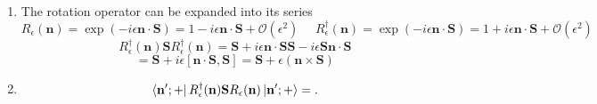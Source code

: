 \begin{sol}
        \begin{enumerate}[label=\textbf{(\alph*)}]
            \item
            The rotation operator can be expanded into its series
            \[
                R_\epsilon(\mathbf{n})=\exp\left(- i\epsilon\mathbf{n}\cdot\mathbf{S} \right)=1-i\epsilon\mathbf{n}\cdot\mathbf{S}+\mathcal{O}\left( \epsilon^2 \right) \:\:\:\:\:\: 
                R_\epsilon^\dagger(\mathbf{n})=\exp\left( -i\epsilon\mathbf{n}\cdot\mathbf{S} \right)=1+i\epsilon\mathbf{n}\cdot\mathbf{S}+\mathcal{O}\left( \epsilon^2 \right)  
            \]
            \[
                R_\epsilon^\dagger(\mathbf{n})\mathbf{S}R_\epsilon^\dagger(\mathbf{n})=\mathbf{S}+i\epsilon\mathbf{n\cdot S}\mathbf{S}-i\epsilon\mathbf{Sn\cdot S}
            \] 
            \[
                =\mathbf{S}+i\epsilon[\mathbf{n\cdot S},\mathbf{S}]=\mathbf{S}+\epsilon(\mathbf{n}\times\mathbf{S})
            \] 
        \item
            \[
                \bra{\mathbf{n'};+}R_\epsilon^\dagger(\mathbf{n})\mathbf{S}R_\epsilon(\mathbf{n})\ket{\mathbf{n'};+} = 
            .\] 

        \end{enumerate}
    \end{sol}    